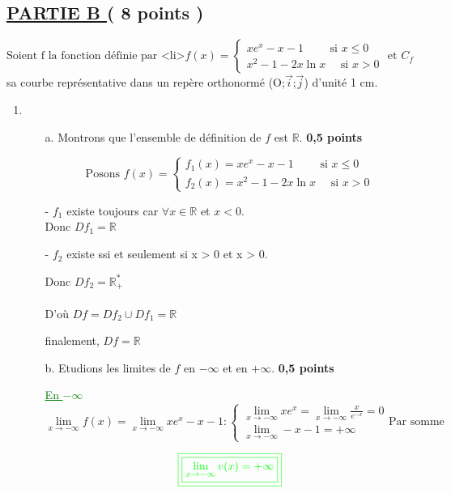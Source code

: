 \documentclass[12pt]{article}
\begin{document}
\subsection*{ \underline{PARTIE B } ( 8 points ) }
\(
\text{Soient f la fonction définie par <li>} 
f(x)=
\begin{cases}
xe^{x}-x-1 \quad\quad  \text{ si }  x \leq 0\\
x^{2}-1-2x\ln x \quad \text{ si } x > 0 
\end{cases}
\)
et $C_{f}$ sa courbe représentative dans un repère orthonormé (O;$\vec{i}$;$\vec{j}$) d'unité 1 cm.
\begin{enumerate}
\item
\begin{enumerate}
\item[a.] Montrons que l'ensemble de définition de $f$ est $\mathbb{R}$.\textbf{ 0,5 points}

\[
\text{Posons } 
f(x)=
\begin{cases}
f_{1}(x)=xe^{x}-x-1 \quad\quad  \text{ si }  x \leq 0\\
f_{2}(x)=x^{2}-1-2x\ln x \quad \text{ si } x > 0 
\end{cases}
\]
\item[-] $f_{1}$ existe toujours car $\forall x\in\mathbb{R}$ et $x<0$. \\

Donc $Df_{1}=\mathbb{R}$

\item[-] $f_{2}$ existe ssi et seulement si x > 0 et x > 0.

Donc $Df_{2}=\mathbb{R}_{+}^{*}$
\\\\
D'où $Df=Df_{2}\cup Df_{1}=\mathbb{R}$

finalement, $Df=\mathbb{R}$
\item[b.] Etudions les limites de $f$ en $-\infty$ et en $+\infty$.\textbf{ 0,5 points}

\textcolor{green}{\underline{En $-\infty$}}
\[
\lim_{x \to -\infty}f(x)=\lim_{x \to -\infty}xe^{x}-x-1 : 
\begin{cases}
\lim_{x \to -\infty}xe^{x}=\lim_{x \to -\infty}\frac{x}{e^{-x}}=0\\
\lim_{x \to -\infty}-x-1=+\infty
\end{cases}
\text{Par somme}
\]

\[\textcolor{green}{\boxed{\textcolor{green}{\boxed{\lim_{x\to -\infty}v(x)=+\infty}}}}\]


\end{enumerate}
\end{enumerate}
\end{document}
